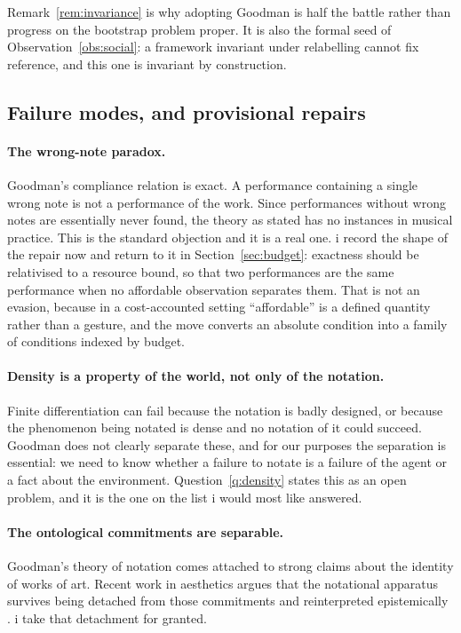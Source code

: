 \noindent
Remark~\ref{rem:invariance} is why adopting Goodman is half the
battle rather than progress on the bootstrap problem proper.
It is also the formal seed of Observation~\ref{obs:social}: a
framework invariant under relabelling cannot fix reference, and
this one is invariant by construction.

\subsection{Failure modes, and provisional repairs}
\label{sec:failures}

\paragraph{The wrong-note paradox.}
Goodman's compliance relation is exact.
A performance containing a single wrong note is not a performance
of the work.
Since performances without wrong notes are essentially never found,
the theory as stated has no instances in musical practice.
This is the standard objection and it is a real one.
i record the shape of the repair now and return to it in
Section~\ref{sec:budget}: exactness should be relativised to a
resource bound, so that two performances are the same performance
when no affordable observation separates them.
That is not an evasion, because in a cost-accounted setting
``affordable'' is a defined quantity rather than a gesture, and the
move converts an absolute condition into a family of conditions
indexed by budget.

\paragraph{Density is a property of the world, not only of the notation.}
Finite differentiation can fail because the notation is badly
designed, or because the phenomenon being notated is dense and no
notation of it could succeed.
Goodman does not clearly separate these, and for our purposes the
separation is essential: we need to know whether a failure to
notate is a failure of the agent or a fact about the environment.
Question~\ref{q:density} states this as an open problem, and it is
the one on the list i would most like answered.

\paragraph{The ontological commitments are separable.}
Goodman's theory of notation comes attached to strong claims about
the identity of works of art.
Recent work in aesthetics argues that the notational apparatus
survives being detached from those commitments and reinterpreted
epistemically \cite{estetika2026}.
i take that detachment for granted.


